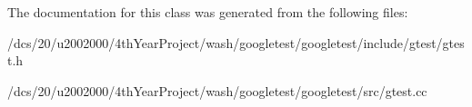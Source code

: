 The documentation for this class was generated from the following files\+:\begin{DoxyCompactItemize}
\item 
/dcs/20/u2002000/4th\+Year\+Project/wash/googletest/googletest/include/gtest/gtest.\+h\item 
/dcs/20/u2002000/4th\+Year\+Project/wash/googletest/googletest/src/gtest.\+cc\end{DoxyCompactItemize}
